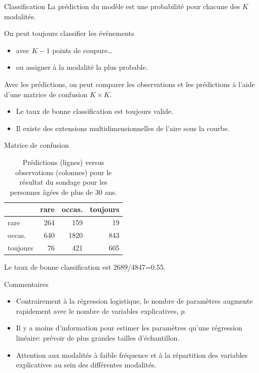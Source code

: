 \documentclass[
  ignorenonframetext,
]{beamer}
\providecommand{\tightlist}{%
  \setlength{\itemsep}{0pt}\setlength{\parskip}{0pt}}\usepackage{longtable,booktabs,array}
\begin{document}
\begin{frame}{Classification}
\label{classification}
La prédiction du modèle est une probabilité pour chacune des \(K\)
modalités.

On peut toujours classifier les événements

\begin{itemize}
\tightlist
\item
  avec \(K-1\) points de coupure\ldots{}
\item
  ou assigner à la modalité la plus probable.
\end{itemize}

Avec les prédictions, on peut comparer les observations et les
prédictions à l'aide d'une matrice de confusion \(K \times K\).

\begin{itemize}
\tightlist
\item
  Le taux de bonne classification est toujours valide.
\item
  Il existe des extensions multidimensionnelles de l'aire sous la
  courbe.
\end{itemize}
\end{frame}

\begin{frame}{Matrice de confusion}
\label{matrice-de-confusion}
\begin{longtable}[]{@{}lrrr@{}}

\caption{\label{tbl-confusmat}Prédictions (lignes) versus observations
(colonnes) pour le résultat du sondage pour les personnes âgées de plus
de 30 ans.}

\tabularnewline

\toprule\noalign{}
& rare & occas. & toujours \\
\midrule\noalign{}
\endhead
\bottomrule\noalign{}
\endlastfoot
rare & 264 & 159 & 19 \\
occas. & 640 & 1820 & 843 \\
toujours & 76 & 421 & 605 \\

\end{longtable}

Le taux de bonne classification est 2689/4847=0.55.
\end{frame}

\begin{frame}{Commentaires}
\label{commentaires}
\begin{itemize}
\tightlist
\item
  Contrairement à la régression logistique, le nombre de paramètres
  augmente rapidement avec le nombre de variables explicatives, \(p\).
\item
  Il y a moins d'information pour estimer les paramètres qu'une
  régression linéaire: prévoir de plus grandes tailles d'échantillon.
\item
  Attention aux modalités à faible fréquence et à la répartition des
  variables explicatives au sein des différentes modalités.
\end{itemize}
\end{frame}
\end{document}
